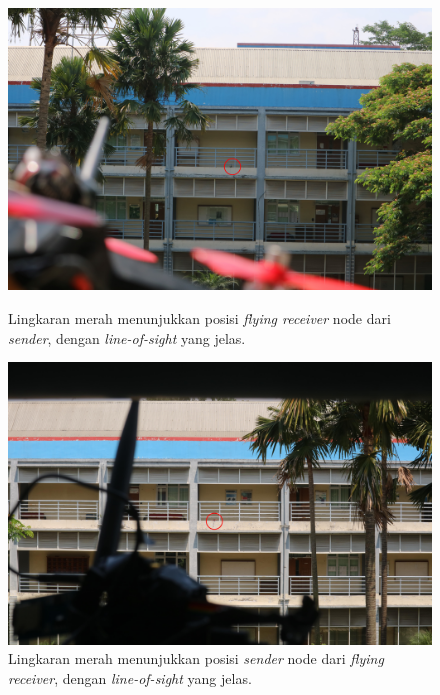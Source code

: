 \begin{figure}[H]
	\centering
	\includegraphics[scale=0.04]{./assets/Pengujian/PengujianGedungN/LineOfSightDariSender}
	\caption{Lingkaran merah menunjukkan posisi \textit{flying receiver} node dari \textit{sender}, dengan \textit{line-of-sight} yang jelas.}
	
	\includegraphics[scale=0.04]{./assets/Pengujian/PengujianGedungN/LineOfSightDariFlyingReceiver}
	\caption{Lingkaran merah menunjukkan posisi \textit{sender} node dari \textit{flying receiver}, dengan \textit{line-of-sight} yang jelas.}
	

\end{figure}
